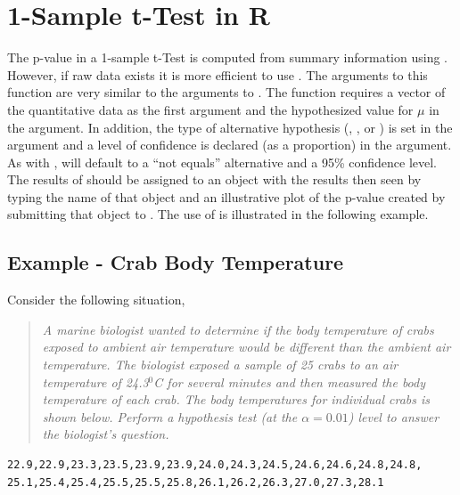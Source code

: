 \documentclass[10pt,openany]{book}\usepackage[]{graphicx}\usepackage[]{color}
\begin{document}
\section{1-Sample t-Test in R}
The p-value in a 1-sample t-Test is computed from summary information using .  However, if raw data exists it is more efficient to use .  The arguments to this function are very similar to the arguments to .  The  function requires a vector of the quantitative data as the first argument and the hypothesized value for $\mu$ in the  argument.  In addition, the type of alternative hypothesis (, , or ) is set in the  argument and a level of confidence is declared (as a proportion) in the  argument.  As with ,  will default to a ``not equals'' alternative and a 95\% confidence level.  The results of  should be assigned to an object with the results then seen by typing the name of that object and an illustrative plot of the p-value created by submitting that object to .  The use of  is illustrated in the following example.

\subsection{Example - Crab Body Temperature}
Consider the following situation,
\begin{quote}
\textsl{A marine biologist wanted to determine if the body temperature of crabs exposed to ambient air temperature would be different than the ambient air temperature.  The biologist exposed a sample of 25 crabs to an air temperature of 24.3$^{0}$C for several minutes and then measured the body temperature of each crab.  The body temperatures for individual crabs is shown below.  Perform a hypothesis test (at the $\alpha=0.01$) level to answer the biologist's question.}
\end{quote}

\begin{Verbatim}[xleftmargin=5mm]
22.9,22.9,23.3,23.5,23.9,23.9,24.0,24.3,24.5,24.6,24.6,24.8,24.8,
25.1,25.4,25.4,25.5,25.5,25.8,26.1,26.2,26.3,27.0,27.3,28.1
\end{Verbatim}
\end{document}
